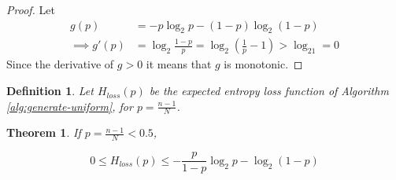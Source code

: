 \documentclass[12pt]{article}
\newtheorem{definition}{Definition}
\newtheorem{theorem}{Theorem}
\begin{document}
\begin{proof}
    Let
    \begin{align}
        g(p) & = -p\log_2 p - (1-p)\log_2(1-p) \\
        \implies g'(p) & = \log_2\frac{1-p}{p} = \log_2(\frac{1}{p}-1) > \log_21 = 0 
    \end{align}
Since the derivative of $g>0$ it means that $g$ is monotonic.
\end{proof}

\begin{definition}
    Let $H_{loss}(p)$ be the expected entropy loss function of Algorithm \ref{alg:generate-uniform}, for $p=\frac{n-1}{N}$.
\end{definition}

\begin{theorem}
    \label{thm:loss}
If $p = \frac{n-1}{N} < 0.5$,

\begin{equation}
0 \le H_{loss}(p) \le -\frac{p}{1-p}\log_2p - \log_2(1-p)
\end{equation}

\end{theorem}
\end{document}
